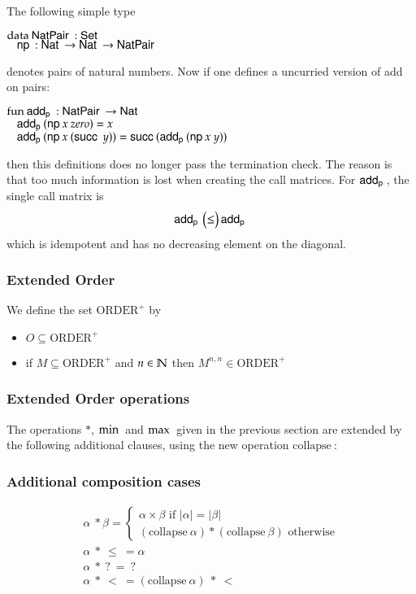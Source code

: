 The following simple type
\begin{bsp}
$\mathrm{data}\: \mathsf{NatPair}\: : \mathsf{Set}$\\
$\hspace*{3mm} \mathsf{np}\: : \mathsf{Nat}\: \rightarrow \mathsf{Nat}\: \rightarrow \mathsf{NatPair}\: $
\end{bsp}
denotes pairs of natural numbers. Now if one defines a uncurried version of add on pairs:
\begin{bsp}
$\mathrm{fun}\: \mathsf{add_p}\: : \mathsf{NatPair}\: \rightarrow \mathsf{Nat}\:$\\
$\hspace*{3mm} \mathsf{add_p}\: (\mathsf{np}\: x \: zero) = x$\\
$\hspace*{3mm} \mathsf{add_p}\: (\mathsf{np}\: x \: (\mathsf{succ}\: \: y)) = \mathsf{succ}\: (\mathsf{add_p}\: (\mathsf{np}\: x \: y))$
\end{bsp}
\noindent then this definitions does no longer pass the termination check.
The reason is that too much information is lost when creating the call matrices.
For $\mathsf{add_p}\:$, the single call matrix is 
\[
\mathsf{add_p}\: \begin{pmatrix}
\leq \\
\end{pmatrix}\mathsf{add_p}\:
\]
which is idempotent and has no decreasing element on the diagonal.
\newcommand{\coll}{\mathrm{collapse}\:}

\newcommand{\opl}{\operatorname{ORDER^{+}}}

\subsubsection{Extended Order}
We define the set $\opl$ by   
\begin{itemize}
\item
$ O \subseteq \opl$
\item
if $ M \subseteq \opl $ and $n \in \mathbb{N} $ then $M^{n,n} \in \opl$
\end{itemize}

\subsubsection{Extended Order operations}
The operations $*$, $\operatorname{min}\:$ and $\operatorname{max}\:$ given in the previous section are extended by the following additional clauses, using the new operation $\coll$:



\subsubsection{Additional composition cases}
\[
\begin{array}{ll}
\alpha \: * \beta = \left\{ \begin{array}{l}
                          \alpha \times \beta \mbox{ if } \vert \alpha \vert = \vert \beta \vert \\
                          (\coll \alpha) * (\coll \beta) \mbox{ otherwise}  
                          \end{array}\right. \\
\alpha \: * \: \leq \: = \alpha \\
\alpha \: * \: ? \:    = \: ? \\
\alpha \: * \: < \:    = (\coll \alpha) \: * \: < 
\end{array}
\]
